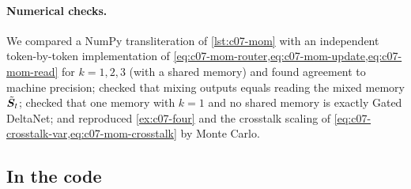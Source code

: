 \paragraph{Numerical checks.} We compared a NumPy transliteration of \cref{lst:c07-mom} with an
independent token-by-token implementation of
\cref{eq:c07-mom-router,eq:c07-mom-update,eq:c07-mom-read} for $k = 1, 2, 3$ (with a shared
memory) and found agreement to machine precision; checked that mixing outputs equals reading
the mixed memory $\tilde{\bm{S}}_t$; checked that one memory with $k = 1$ and no shared memory is
exactly Gated DeltaNet; and reproduced \cref{ex:c07-four} and the crosstalk scaling of
\cref{eq:c07-crosstalk-var,eq:c07-mom-crosstalk} by Monte Carlo.

\subsection{In the code}\label{sec:c07-mom-code}

